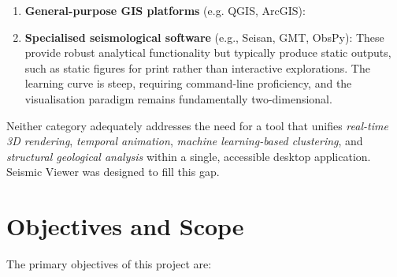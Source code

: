 \begin{enumerate}[label=(\alph*)]
    \item \textbf{General-purpose GIS platforms} (e.g. QGIS, ArcGIS): 

    \item \textbf{Specialised seismological software} (e.g., Seisan, GMT, ObsPy): These provide robust analytical functionality but typically produce static outputs, such as static figures for print rather than interactive explorations. The learning curve is steep, requiring command-line proficiency, and the visualisation paradigm remains fundamentally two-dimensional.
\end{enumerate}

Neither category adequately addresses the need for a tool that unifies \textit{real-time 3D rendering}, \textit{temporal animation}, \textit{machine learning-based clustering}, and \textit{structural geological analysis} within a single, accessible desktop application. Seismic Viewer was designed to fill this gap.

\section{Objectives and Scope}
\label{sec:objectives}

The primary objectives of this project are:

